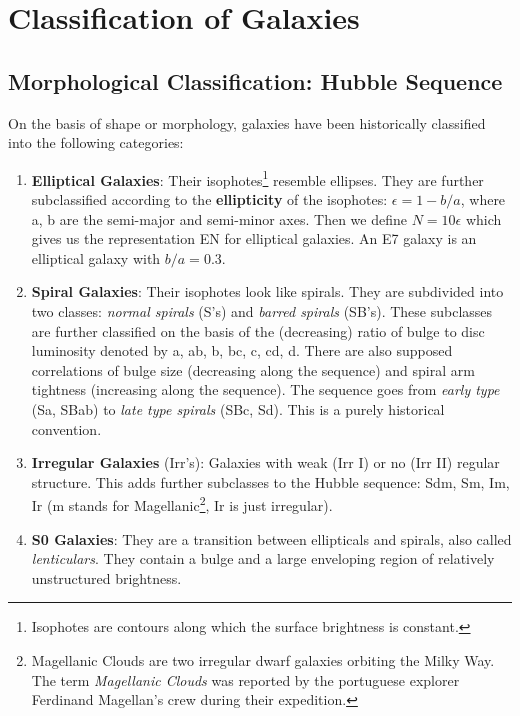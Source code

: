 \documentclass[a4paper,11pt]{report}
\newcommand{\ti}[1]{\textit{#1}}
\begin{document}
\section{Classification of Galaxies}

\subsection{Morphological Classification: Hubble Sequence}
On the basis of shape or morphology, galaxies have been historically classified into the following categories:

\begin{enumerate}
  \item \textbf{Elliptical Galaxies}: Their isophotes\footnote{Isophotes are contours along which the surface brightness is constant.} resemble ellipses. They are further subclassified according to the \textbf{ellipticity} of the isophotes: $\epsilon = 1 - b/a$, where a, b are the semi-major and semi-minor axes. Then we define $N = 10 \epsilon$ which gives us the representation EN for elliptical galaxies. An E7 galaxy is an elliptical galaxy with $b/a = 0.3$.
    
  \item \textbf{Spiral Galaxies}: Their isophotes look like spirals. They are subdivided into two classes: \ti{normal spirals} (S's) and \ti{barred spirals} (SB's). These subclasses are further classified on the basis of the (decreasing) ratio of bulge to disc luminosity denoted by a, ab, b, bc, c, cd, d. There are also supposed correlations of bulge size (decreasing along the sequence) and spiral arm tightness (increasing along the sequence). The sequence goes from \textit{early type} (Sa, SBab) to \textit{late type spirals} (SBc, Sd). This is a purely historical convention.
    
  \item \textbf{Irregular Galaxies} (Irr's): Galaxies with weak (Irr \RN{1}) or no (Irr \RN{2}) regular structure. This adds further subclasses to the Hubble sequence: Sdm, Sm, Im, Ir (m stands for Magellanic\footnote{Magellanic Clouds are two irregular dwarf galaxies orbiting the Milky Way. The term \ti{Magellanic Clouds} was reported by the portuguese explorer Ferdinand Magellan's crew during their expedition.}, Ir is just irregular).
    
  \item \textbf{S0 Galaxies}: They are a transition between ellipticals and spirals, also called \ti{lenticulars}. They contain a bulge and a large enveloping region of relatively unstructured brightness.
\end{enumerate}
\end{document}
